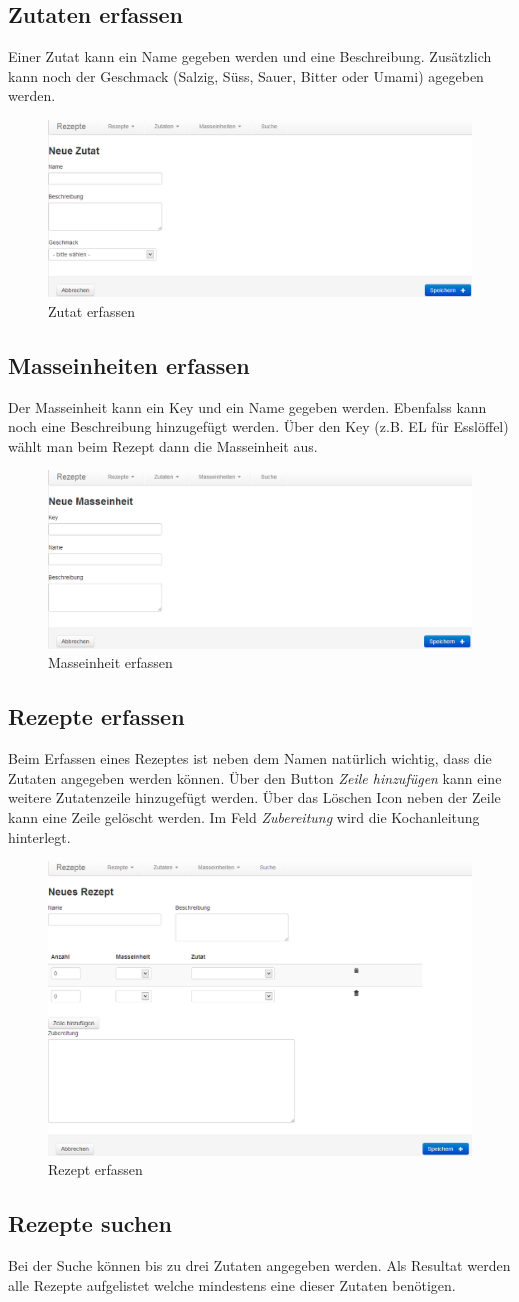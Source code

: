 \subsection{Zutaten erfassen}
Einer Zutat kann ein Name gegeben werden und eine Beschreibung. Zusätzlich kann noch der Geschmack (Salzig, Süss, Sauer, Bitter oder Umami) agegeben werden.
\begin{figure}[h]
\centering
\includegraphics[width=0.5\columnwidth]{graphics/erfassen_zutat.png}%
	\caption{Zutat erfassen}
	\label{fig:erfassen_zutat}
\end{figure}

\subsection{Masseinheiten erfassen}
Der Masseinheit kann ein Key und ein Name gegeben werden. Ebenfalss kann noch eine Beschreibung hinzugefügt werden. Über den Key (z.B. EL für Esslöffel) wählt man beim Rezept dann die Masseinheit aus. 
\begin{figure}[h]
\centering
\includegraphics[width=0.5\columnwidth]{graphics/erfassen_masseinheit.png}%
	\caption{Masseinheit erfassen}
	\label{fig:erfassen_masseinheit}
\end{figure}

\subsection{Rezepte erfassen}
Beim Erfassen eines Rezeptes ist neben dem Namen natürlich wichtig, dass die Zutaten angegeben werden können. Über den Button \emph{Zeile hinzufügen} kann eine weitere Zutatenzeile hinzugefügt werden. Über das Löschen Icon neben der Zeile kann eine Zeile gelöscht werden. Im Feld \emph{Zubereitung} wird die Kochanleitung hinterlegt.
\begin{figure}[h]
\centering
\includegraphics[width=0.5\columnwidth]{graphics/erfassen_rezept.png}%
	\caption{Rezept erfassen}
	\label{fig:erfassen_rezept}
\end{figure}

\subsection{Rezepte suchen}
Bei der Suche können bis zu drei Zutaten angegeben werden. Als Resultat werden alle Rezepte aufgelistet welche mindestens eine dieser Zutaten benötigen.